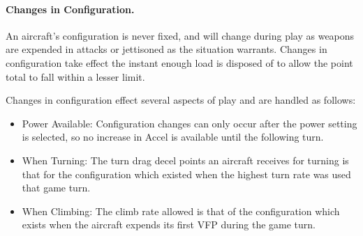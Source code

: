 \paragraph{Changes in Configuration.} An aircraft's configuration is never fixed, and will change during play as weapons are expended in attacks or jettisoned as the situation warrants. Changes in configuration take effect the instant enough load is disposed of to allow the point total to fall within a lesser limit.

Changes in configuration effect several aspects of play and are handled as follows:

\begin{itemize}

    \item Power Available: Configuration changes can only occur after the power setting is selected, so no increase in Accel is available until the following turn.


    \item When Turning: The turn drag decel points an aircraft receives for turning is that for the configuration which existed when the highest turn rate was used that game turn.

    \item When Climbing: The climb rate allowed is that of the configuration which exists when the aircraft expends its first VFP during the game turn.

\end{itemize}



